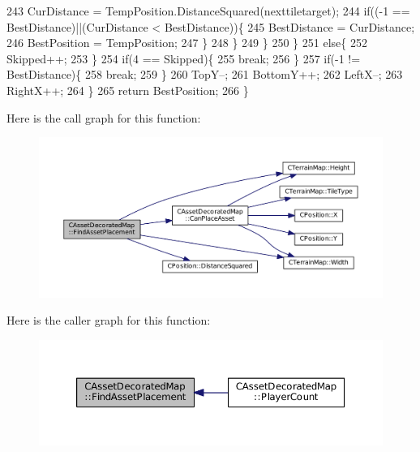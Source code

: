 \begin{DoxyCode}
243                     CurDistance = TempPosition.DistanceSquared(nexttiletarget);
244                     \textcolor{keywordflow}{if}((-1 == BestDistance)||(CurDistance < BestDistance))\{
245                         BestDistance = CurDistance;
246                         BestPosition = TempPosition;
247                     \}
248                 \}
249             \}
250         \}
251         \textcolor{keywordflow}{else}\{
252             Skipped++;   
253         \}
254         \textcolor{keywordflow}{if}(4 == Skipped)\{
255             \textcolor{keywordflow}{break};   
256         \}
257         \textcolor{keywordflow}{if}(-1 != BestDistance)\{
258             \textcolor{keywordflow}{break};    
259         \}
260         TopY--;
261         BottomY++;
262         LeftX--;
263         RightX++;
264     \}
265     \textcolor{keywordflow}{return} BestPosition;
266 \}
\end{DoxyCode}
Here is the call graph for this function\+:\nopagebreak
\begin{figure}[H]
\begin{center}
\leavevmode
\includegraphics[width=350pt]{classCAssetDecoratedMap_a82c30235ceaa63c7382c662687acf9fe_cgraph}
\end{center}
\end{figure}
Here is the caller graph for this function\+:\nopagebreak
\begin{figure}[H]
\begin{center}
\leavevmode
\includegraphics[width=350pt]{classCAssetDecoratedMap_a82c30235ceaa63c7382c662687acf9fe_icgraph}
\end{center}
\end{figure}
\hypertarget{classCAssetDecoratedMap_a4029b81572e80d897eb4e165c6e925be}{}\label{classCAssetDecoratedMap_a4029b81572e80d897eb4e165c6e925be} 
